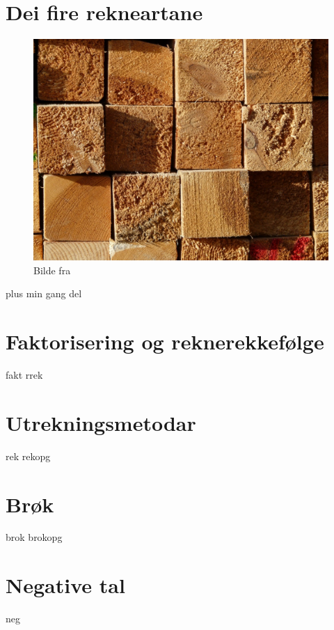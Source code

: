 \chapter{Dei fire rekneartane \label{Rekneartane}}
\begin{figure}
	\centering
	\includegraphics[scale=0.38]{wood} \\
{\footnotesize Bilde fra } 
\end{figure}
\newpage
{plus}
{min}
{gang}
{del}

\chapter{Faktorisering og reknerekkefølge \label{Faktogreknrekflg}}
\newpage
{fakt}
{rrek}

\chapter{Utrekningsmetodar \label{Utrekning}}
\newpage
{rek}
\newpage
{rekopg}

\chapter{Brøk \label{Brok}}
\newpage
{brok}
\newpage
{brokopg}

\chapter{Negative tal \label{Negtal}}
\newpage
{neg}



